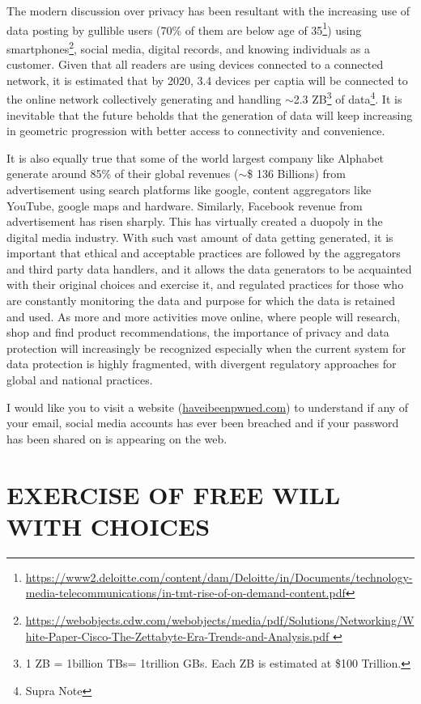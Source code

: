\begin{multicols}{2}
The modern discussion over privacy has been resultant with the increasing use of data posting by gullible users (70\% of them are below age of 35\footnote{\url{https://www2.deloitte.com/content/dam/Deloitte/in/Documents/technology-media-telecommunications/in-tmt-rise-of-on-demand-content.pdf}}) using smartphones\footnote{\url {https://webobjects.cdw.com/webobjects/media/pdf/Solutions/Networking/White-Paper-Cisco-The-Zettabyte-Era-Trends-and-Analysis.pdf }}, social media, digital records, and knowing individuals as a customer. Given that all readers are using devices connected to a connected network, it is estimated that by 2020, 3.4 devices per captia will be connected to the online network collectively generating and handling $\sim$2.3 ZB\footnote{1 ZB = 1billion TBs= 1trillion GBs. Each ZB is estimated at \$100 Trillion.} of data\footnote{Supra Note }. It is inevitable that the future beholds that the generation of data will keep increasing in geometric progression with better access to connectivity and convenience. 

It is also equally true that some of the world largest company like Alphabet generate around 85\% of their global revenues ($\sim$\$ 136 Billions) from advertisement using search platforms like google, content aggregators like YouTube, google maps and hardware. Similarly, Facebook revenue from advertisement has risen sharply. This has virtually created a duopoly in the digital media industry. With such vast amount of data getting generated, it is important that ethical and acceptable practices are followed by the aggregators and third party data handlers, and it allows the data generators to be acquainted with their original choices and exercise it, and regulated practices for those who are constantly monitoring the data and purpose for which the data is retained and used. As more and more activities move online, where people will research, shop and find product recommendations, the importance of privacy and data protection will increasingly be recognized especially when the current system for data protection is highly fragmented, with divergent regulatory approaches for global and national practices. 

I would like you to visit a website (\url{haveibeenpwned.com}) to understand if any of your email, social media accounts has ever been breached and if your password has been shared on is appearing on the web.

\section{EXERCISE OF FREE WILL WITH CHOICES}


\end{multicols}
